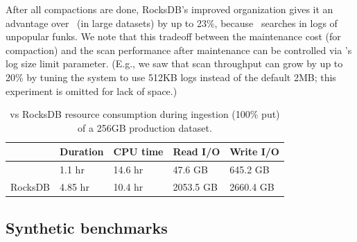 After all compactions are done, RocksDB's improved organization gives it an advantage  over \sys\
(in large datasets) by up to 23\%, because \sys\ searches
in  logs of unpopular funks. We note that this tradeoff between the maintenance cost (for compaction) 
and the scan performance after maintenance  can be controlled via \sys's log size limit parameter.
(E.g., we saw that scan throughput can  grow by up to 20\%  by tuning the system to use 512KB logs instead of
the default 2MB; this experiment is omitted for lack of space.)



\begin{table}[t]
\small
\begin{tabular}{lllll}
& Duration
 &  CPU time  & Read I/O & Write I/O\\
\hline 
\sys &  1.1 hr & 14.6 hr & 	47.6 GB 	&  645.2	GB \\
RocksDB & 4.85 hr & 10.4 hr &  2053.5 GB & 2660.4	GB\\
\end{tabular}
\caption{\sys\/ vs RocksDB resource consumption during ingestion (100\% put) of a 256GB production dataset.}
\label{fig:io_cpu_bound}
\end{table}

\subsection{Synthetic benchmarks}
\label{ssec:synthetic} 

